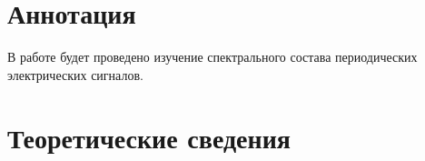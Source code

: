  


\section{Аннотация}
В работе будет проведено изучение
спектрального состава периодических
электрических сигналов.

\section{Теоретические сведения}







